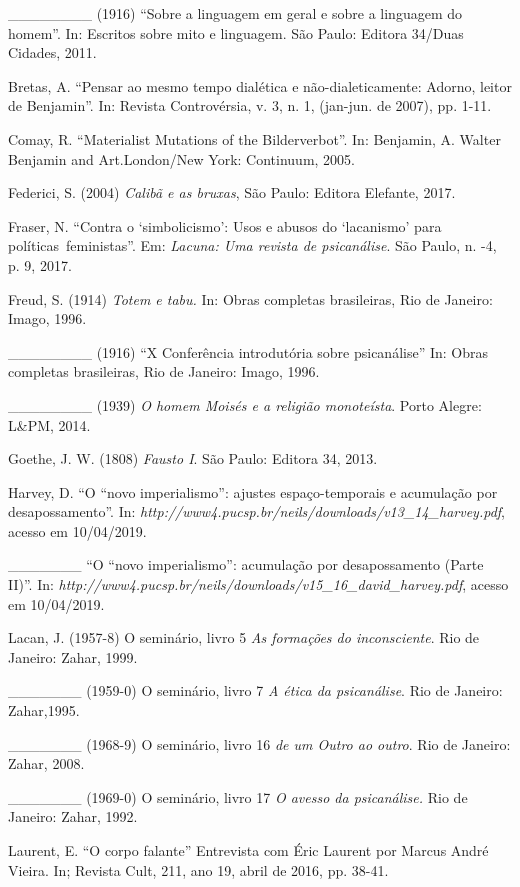 \_\_\_\_\_\_\_\_ (1916) ``Sobre a linguagem em geral e sobre a linguagem
do homem''. In: Escritos sobre mito e linguagem. São Paulo: Editora
34/Duas Cidades, 2011.

Bretas, A. ``Pensar ao mesmo tempo dialética e não-dialeticamente:
Adorno, leitor de Benjamin''. In: Revista Controvérsia, v. 3, n. 1,
(jan-jun. de 2007), pp. 1-11.

Comay, R. ``Materialist Mutations of the Bilderverbot''. In: Benjamin,
A. Walter Benjamin and Art.London/New York: Continuum, 2005.

Federici, S. (2004) \emph{Calibã e as bruxas}, São Paulo: Editora
Elefante, 2017.

Fraser, N. ``Contra o `simbolicismo': Usos e abusos do `lacanismo' para
políticas~feministas''. Em: \emph{Lacuna: Uma revista de psicanálise}.
São Paulo, n. -4, p. 9, 2017.

Freud, S. (1914) \emph{Totem e tabu.} In: Obras completas brasileiras,
Rio de Janeiro: Imago, 1996.

\_\_\_\_\_\_\_\_ (1916) ``X Conferência introdutória sobre psicanálise''
In: Obras completas brasileiras, Rio de Janeiro: Imago, 1996.

\_\_\_\_\_\_\_\_ (1939) \emph{O homem Moisés e a religião monoteísta}.
Porto Alegre: L\&PM, 2014.

Goethe, J. W. (1808) \emph{Fausto I}. São Paulo: Editora 34, 2013.

Harvey, D. ``O ``novo imperialismo'': ajustes espaço-temporais e
acumulação por desapossamento''. In:
\emph{http://www4.pucsp.br/neils/downloads/v13\_14\_harvey.pdf},
acesso em 10/04/2019.

\_\_\_\_\_\_\_ ``O ``novo imperialismo'': acumulação por desapossamento
(Parte II)''. In:
\emph{http://www4.pucsp.br/neils/downloads/v15\_16\_david\_harvey.pdf},
acesso em 10/04/2019.

Lacan, J. (1957-8) O seminário, livro 5 \emph{As formações do
inconsciente}. Rio de Janeiro: Zahar, 1999.

\_\_\_\_\_\_\_ (1959-0) O seminário, livro 7 \emph{A ética da
psicanálise}. Rio de Janeiro: Zahar,1995.

\_\_\_\_\_\_\_ (1968-9) O seminário, livro 16 \emph{de um Outro ao
outro}. Rio de Janeiro: Zahar, 2008.

\_\_\_\_\_\_\_ (1969-0) O seminário, livro 17 \emph{O avesso da
psicanálise.} Rio de Janeiro: Zahar, 1992.

Laurent, E. ``O corpo falante'' Entrevista com Éric Laurent por Marcus
André Vieira. In; Revista Cult, 211, ano 19, abril de 2016, pp. 38-41.

